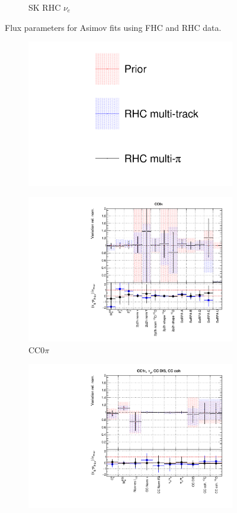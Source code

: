 \begin{figure}[t]
\begin{subfigure}{0.24\textwidth}
  \caption{SK RHC $\nu_e$}
  \label{fig:}
\end{subfigure}
\caption{Flux parameters for Asimov fits using FHC and RHC data.}
\label{fig:rhcmpiasmvSK}
\end{figure}

\begin{figure}[t]
\centering
\begin{subfigure}{0.95\textwidth}
  \centering
  \includegraphics[width=0.25\linewidth]{figs/rhcmpasmv_leg}
  \caption{}
  \label{fig:}
\end{subfigure}
\begin{subfigure}{0.49\textwidth}
  \centering
  \includegraphics[width=0.95\linewidth]{figs/rhcmpasmvxsec1}
  \caption{CC0$\pi$}
  \label{fig:}
\end{subfigure}
\begin{subfigure}{0.49\textwidth}
  \centering
  \includegraphics[width=0.95\linewidth]{figs/rhcmpasmvxsec2}

\end{subfigure}
\end{figure}
